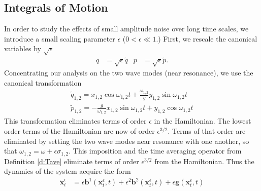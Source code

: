 \subsection{Integrals of Motion}\label{s:Integrals of motion} In
order to study the effects of small amplitude noise over long time
scales, we introduce a small scaling parameter $\epsilon$
($0<\epsilon\ll1$.) First, we rescale the canonical variables by
$\sqrt{\epsilon}$
\begin{align*}
q &=\sqrt{\epsilon}\tilde{q}& 
p &=\sqrt{\epsilon}\tilde{p}.
\end{align*}
Concentrating our analysis on the two wave modes (near resonance), we use the canonical transformation
\begin{gather*}
\tilde{q}_{1,2} = x_{1,2} \cos \omega_{1,2} t +\tfrac{\omega_{1,2}}{g} y_{1,2} \sin
\omega_{1,2} t\\
\tilde{p}_{1,2} = -\tfrac{g}{\omega_{1,2}} x_{1,2} \sin \omega_{1,2} t + y_{1,2} \cos
\omega_{1,2} t
\end{gather*}
This transformation eliminates terms of order $\epsilon$ in the
Hamiltonian. The lowest order terms of the Hamiltonian are now of
order $\epsilon^{3/2}$. Terms of that order are eliminated by
setting the two wave modes near resonance with one another, so that
$\omega_{1,2} = \omega + \epsilon \sigma_{1,2}$. This imposition and the time averaging operator from Definition \ref{d:Tave} eliminate terms of order $\epsilon^{3/2}$ from the Hamiltonian. Thus the dynamics of the system acquire the form
\begin{align}
\dot{\boldsymbol{x}}^{\epsilon}_t& = \epsilon \boldsymbol{b}^1
(\boldsymbol{x}^{\epsilon}_t,t) + \epsilon^2 \boldsymbol{b}^2
(\boldsymbol{x}^{\epsilon}_t,t) + \epsilon \boldsymbol{g}
(\boldsymbol{x}^{\epsilon}_t,t)
\label{e:standard form}
\end{align}
